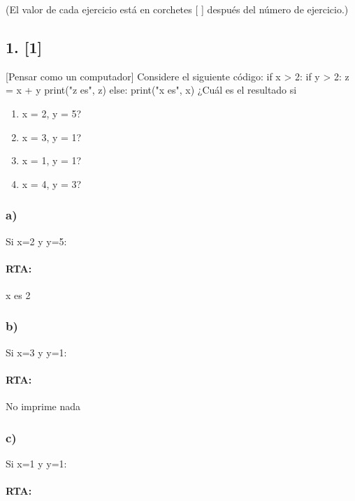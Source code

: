 \documentclass[11pt]{article}
\begin{document}
(El valor de cada ejercicio está en corchetes {[} {]} después del número
de ejercicio.)

    \subsection{1. {[}1{]}}\label{section}

{[}Pensar como un computador{]} Considere el siguiente código:
if x > 2:
    if y > 2:
        z = x + y
        print("z es", z)
else:
   print("x es", x)
    ¿Cuál es el resultado si

\begin{enumerate}
\def\labelenumi{\alph{enumi})}
\item
  x = 2, y = 5?
\item
  x = 3, y = 1?
\item
  x = 1, y = 1?
\item
  x = 4, y = 3?
\end{enumerate}

    \subsubsection{a)}\label{a}

Si x=2 y y=5:

\paragraph{RTA:}\label{rta}

x es 2

\subsubsection{b)}\label{b}

Si x=3 y y=1:

\paragraph{RTA:}\label{rta-1}

No imprime nada

\subsubsection{c)}\label{c}

Si x=1 y y=1:

\paragraph{RTA:}\label{rta-2}
\end{document}
